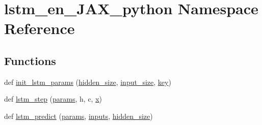 \hypertarget{namespacelstm__en__JAX__python}{}\section{lstm\+\_\+en\+\_\+\+J\+A\+X\+\_\+python Namespace Reference}
\label{namespacelstm__en__JAX__python}
\subsection*{Functions}
\begin{DoxyCompactItemize}
\item 
def \hyperlink{namespacelstm__en__JAX__python_a0ad26ee1f725cb54ad8b749930e094a8}{init\+\_\+lstm\+\_\+params} (\hyperlink{namespacelstm__en__JAX__python_a43773b878a81b64380dbda3a42dc12ac}{hidden\+\_\+size}, \hyperlink{namespacelstm__en__JAX__python_a105f5427a708a0b2b3eb7ed1e551a956}{input\+\_\+size}, \hyperlink{namespacelstm__en__JAX__python_a69d278272de0d7f417fa3a912d7942c1}{key})
\item 
def \hyperlink{namespacelstm__en__JAX__python_ac13ce59fe2b765416eb40e41654be652}{lstm\+\_\+step} (\hyperlink{namespacelstm__en__JAX__python_aa48611ad29dd219713a46cc6d4691a76}{params}, h, c, \hyperlink{addition_8c_a6150e0515f7202e2fb518f7206ed97dc}{x})
\item 
def \hyperlink{namespacelstm__en__JAX__python_a11bf77a2c3fc11105d4d29944e565986}{lstm\+\_\+predict} (\hyperlink{namespacelstm__en__JAX__python_aa48611ad29dd219713a46cc6d4691a76}{params}, \hyperlink{namespacelstm__en__JAX__python_a2e0078d9d0b56fa8efb5e5e7f1a6fb1c}{inputs}, \hyperlink{namespacelstm__en__JAX__python_a43773b878a81b64380dbda3a42dc12ac}{hidden\+\_\+size})
\end{DoxyCompactItemize}
